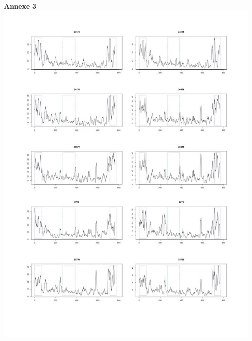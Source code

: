 \documentclass[a4paper, 12pt]{article}
\begin{document}
\begin{onehalfspace}
\newpage
\begin{center}
\Large\textbf{Annexe 3}\\
\includegraphics[scale=0.64]{pic_Data/ane2-1.jpg}\\
\thispagestyle{empty}

\end{center}
\end{onehalfspace}
\end{document}

